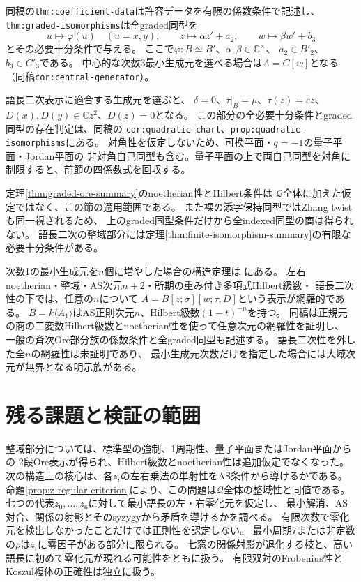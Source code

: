 \documentclass[11pt,a4paper]{ltjsarticle}
\theoremstyle{definition}
\begin{document}
同稿の\texttt{thm:coefficient-data}は許容データを有限の係数条件で記述し、
\texttt{thm:graded-isomorphisms}は全graded同型を
\[
u\longmapsto\varphi(u)\quad(u=x,y),\qquad
z\longmapsto\alpha z'+a_2,\qquad
w\longmapsto\beta w'+b_3
\]
とその必要十分条件で与える。
ここで$\varphi:B\simeq B'$、$\alpha,\beta\in\mathbb C^\times$、
$a_2\in B'_2$、$b_3\in C'_3$である。
中心的な次数3最小生成元を選べる場合は$A=C[w]$となる
（同稿\texttt{cor:central-generator}）。

語長二次表示に適合する生成元を選ぶと、
$\delta=0$、$\tau|_B=\mu$、$\tau(z)=cz$、
$D(x),D(y)\in\mathbb C z^2$、$D(z)=0$となる。
この部分の全必要十分条件とgraded同型の存在判定は、同稿の
\texttt{cor:quadratic-chart}、\texttt{prop:quadratic-isomorphisms}にある。
対角性を仮定しないため、可換平面・$q=-1$の量子平面・Jordan平面の
非対角自己同型も含む。量子平面の上で両自己同型を対角に制限すると、前節の四係数式を回収する。

定理\ref{thm:graded-ore-summary}のnoetherian性とHilbert条件は
$\mathcal Q$全体に加えた仮定ではなく、この節の適用範囲である。
また裸の添字保持同型ではZhang twistも同一視されるため、
上のgraded同型条件だけから全indexed同型の商は得られない。
語長二次の整域部分には定理\ref{thm:finite-isomorphism-summary}の有限な必要十分条件がある。

次数1の最小生成元を$n$個に増やした場合の構造定理は
にある。
左右noetherian・整域・AS次元$n+2$・所期の重み付き多項式Hilbert級数・
語長二次性の下では、任意の$n$について
$A=B[z;\sigma][w;\tau,D]$という表示が網羅的である。
$B=k\langle A_1\rangle$はAS正則次元$n$、Hilbert級数$(1-t)^{-n}$を持つ。
同稿は正規元の商の二変数Hilbert級数とnoetherian性を使って任意次元の網羅性を証明し、
一般の斉次Ore部分族の係数条件と全graded同型も記述する。
語長二次性を外した全$n$の網羅性は未証明であり、
最小生成元次数だけを指定した場合には大域次元が無界となる明示族がある。

\section{残る課題と検証の範囲}
整域部分については、標準型の強制、1周期性、量子平面またはJordan平面からの
2段Ore表示が得られ、Hilbert級数とnoetherian性は追加仮定でなくなった。
次の構造上の核心は、各$z_i$の左右乗法の単射性をAS条件から導けるかである。
命題\ref{prop:z-regular-criterion}により、この問題は$\mathcal Q$全体の整域性と同値である。
七つの代表$z_0,\ldots,z_6$に対して最小語長の左・右零化元を仮定し、
最小解消、AS対合、関係の射影とそのsyzygyから矛盾を導けるかを調べる。
有限次数で零化元を検出しなかったことだけでは正則性を認定しない。
最小周期7または非定数の$\rho$は$z_i$に零因子がある部分に限られる。
七窓の関係射影が退化する枝と、高い語長に初めて零化元が現れる可能性をともに扱う。
有限双対のFrobenius性とKoszul複体の正確性は独立に扱う。
\end{document}
